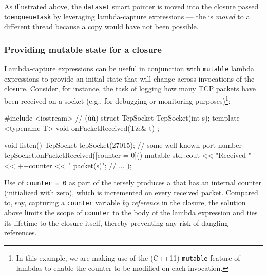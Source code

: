 \noindent As illustrated above, the \lstinline!dataset! smart pointer is moved into
the closure passed to\linebreak[4] \mbox{\lstinline!enqueueTask!} by leveraging lambda-capture
expressions --- the  is \emph{moved}
to a different thread because a copy would have not been possible.

\subsubsection[Providing mutable state for a closure]{Providing mutable state for a closure}\label{providing-mutable-state-for-a-closure}

Lambda-capture expressions can be useful in conjunction with
\lstinline!mutable! lambda expressions to provide an initial state that
will change across invocations of the closure. Consider, for instance,
the task of logging how many TCP packets have been received on a socket
(e.g., for debugging or monitoring purposes){\cprotect\footnote{In
this example, we are making use of the (C++11) \lstinline!mutable! feature
  of lambdas to enable the counter to be modified on each invocation.}}:

\begin{emcppshiddenlisting}[emcppsbatch=e2]
#include <iostream>  // (ù{}ù)
struct TcpSocket {
    TcpSocket(int s);
    template <typename T>
    void onPacketReceived(T&& t) {}
};

\end{emcppshiddenlisting}
\begin{emcppslisting}[emcppsbatch=e2,emcppsstandards={c++14}]
void listen()
{
    TcpSocket tcpSocket(27015);  // some well-known port number
    tcpSocket.onPacketReceived([counter = 0]() mutable
    {
        std::cout << "Received " << ++counter << " packet(s)\n";
        // ...
    });
}
\end{emcppslisting}
    
\noindent Use of \lstinline!counter!~\lstinline!=!~\lstinline!0! as part of the
 tersely produces a 
that has an internal counter (initialized with zero), which is
incremented on every received packet. Compared to, say, capturing a
\lstinline!counter! variable \emph{by reference} in the closure, the solution
above limits the scope of \lstinline!counter! to the body of the lambda
expression and ties its lifetime to the closure itself, thereby
preventing any risk of dangling references.

